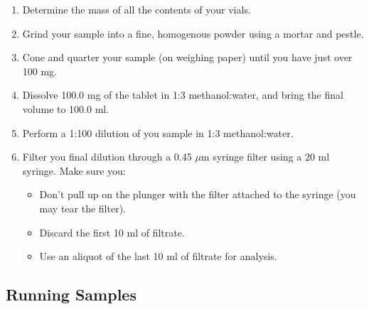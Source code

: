 \documentclass[]{tufte-book}
\providecommand{\tightlist}{%
  \setlength{\itemsep}{0pt}\setlength{\parskip}{0pt}}
\begin{document}
\begin{enumerate}
\def\labelenumi{\arabic{enumi}.}
\tightlist
\item
  Determine the mass of all the contents of your vials.
\item
  Grind your sample into a fine, homogenous powder using a mortar and pestle.
\item
  Cone and quarter your sample (on weighing paper) until you have just over 100 mg.
\item
  Dissolve 100.0 mg of the tablet in 1:3 methanol:water, and bring the final volume to 100.0 ml.
\item
  Perform a 1:100 dilution of you sample in 1:3 methanol:water.
\item
  Filter you final dilution through a 0.45 \(\mu\)m syringe filter using a 20 ml syringe. Make sure you:

  \begin{itemize}
  \tightlist
  \item
    Don't pull up on the plunger with the filter attached to the syringe (you may tear the filter).
  \item
    Discard the first 10 ml of filtrate.
  \item
    Use an aliquot of the last 10 ml of filtrate for analysis.
  \end{itemize}
\end{enumerate}

\hypertarget{running-samples}{%
\subsection{Running Samples}\label{running-samples}}
\end{document}
